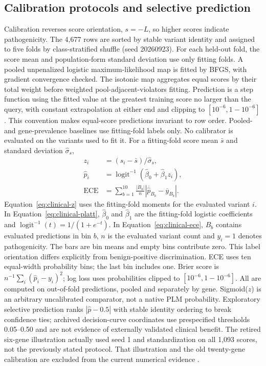 \subsection{Calibration protocols and selective prediction}
Calibration reverses score orientation, $s=-L$, so higher scores indicate pathogenicity. The 4,677 rows are sorted by stable variant identity and assigned to five folds by class-stratified shuffle (seed 20260923). For each held-out fold, the score mean and population-form standard deviation use only fitting folds. A pooled unpenalized logistic maximum-likelihood map is fitted by BFGS, with gradient convergence checked. The isotonic map aggregates equal scores by their total weight before weighted pool-adjacent-violators fitting. Prediction is a step function using the fitted value at the greatest training score no larger than the query, with constant extrapolation at either end and clipping to $[10^{-6},1-10^{-6}]$. This convention makes equal-score predictions invariant to row order. Pooled- and gene-prevalence baselines use fitting-fold labels only. No calibrator is evaluated on the variants used to fit it.
For a fitting-fold score mean $\bar s$ and standard deviation $\widehat\sigma_s$,
\begin{align}
z_i&=(s_i-\bar s)/\widehat\sigma_s,\label{eq:clinical-z}\\
\widehat p_i&=\operatorname{logit}^{-1}(\widehat\beta_0+\widehat\beta_1z_i),\label{eq:clinical-platt}\\
\mathrm{ECE}&=\sum_{b=1}^{10}\frac{|B_b|}{n}\left|\overline{\widehat p}_{B_b}-\overline y_{B_b}\right|.\label{eq:clinical-ece}
\end{align}
Equation~\ref{eq:clinical-z} uses the fitting-fold moments for the evaluated
variant $i$. In Equation~\ref{eq:clinical-platt}, $\widehat\beta_0$ and
$\widehat\beta_1$ are the fitting-fold logistic coefficients and
$\operatorname{logit}^{-1}(t)=1/(1+e^{-t})$. In
Equation~\ref{eq:clinical-ece}, $B_b$ contains evaluated predictions in bin
$b$, $n$ is the evaluated variant count and $y_i=1$ denotes pathogenicity.
The bars are bin means and empty bins contribute zero. This label
orientation differs explicitly from benign-positive discrimination.
ECE uses ten equal-width probability bins; the last bin includes one. Brier score is $n^{-1}\sum_i(\widehat p_i-y_i)^2$; log loss uses probabilities clipped to $[10^{-6},1-10^{-6}]$. All are computed on out-of-fold predictions, pooled and separately by gene. Sigmoid($z$) is an arbitrary uncalibrated comparator, not a native PLM probability. Exploratory selective prediction ranks $|\widehat p-0.5|$ with stable identity ordering to break confidence ties; archived decision-curve coordinates use prespecified thresholds 0.05--0.50 and are not evidence of externally validated clinical benefit. The retired six-gene illustration actually used seed 1 and standardization on all 1,093 scores, not the previously stated protocol. That illustration and the old twenty-gene calibration are excluded from the current numerical evidence \citep{Pejaver2022,Guo2017,Platt1999}.

